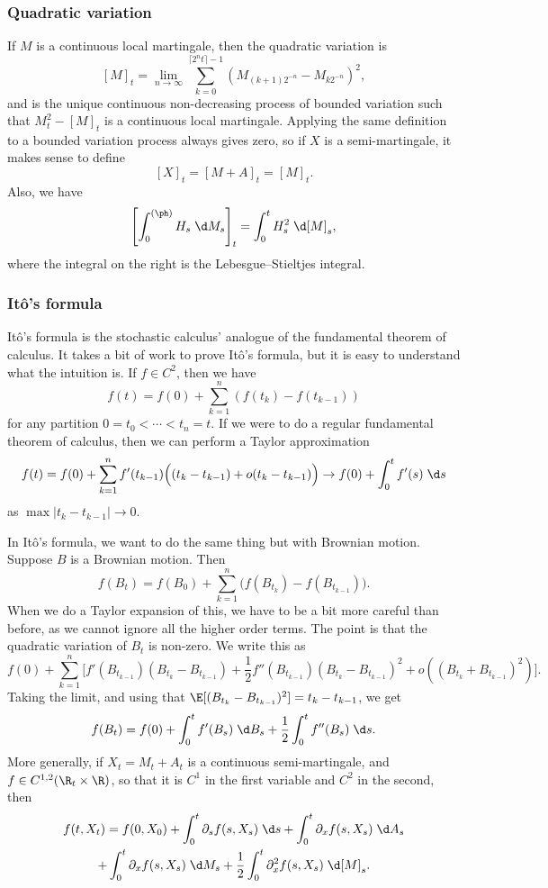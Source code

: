 \documentclass[a4paper]{article}
\begin{document}
\subsubsection*{Quadratic variation}
If $M$ is a continuous local martingale, then the quadratic variation is
\[
  [M]_t = \lim_{n \to \infty} \sum_{k = 0}^{\lceil 2^n t\rceil - 1}(M_{(k + 1)2^{-n}} - M_{k2^{-n}})^2,
\]
and is the unique continuous non-decreasing process of bounded variation such that $M_t^2 - [M]_t$ is a continuous local martingale. Applying the same definition to a bounded variation process always gives zero, so if $X$ is a semi-martingale, it makes sense to define
\[
  [X]_t = [M + A]_t = [M]_t.
\]
Also, we have
\[
  \left[\int_0^{(\ph)} H_s\;\d M_s\right]_t = \int_0^t H_s^2 \;\d [M]_s,
\]
where the integral on the right is the Lebesgue--Stieltjes integral.

\subsubsection*{It\^o's formula}
It\^o's formula is the stochastic calculus' analogue of the fundamental theorem of calculus. It takes a bit of work to prove It\^o's formula, but it is easy to understand what the intuition is. If $f \in C^2$, then we have
\[
  f(t) = f(0) + \sum_{k = 1}^n (f(t_k) - f(t_{k - 1}))
\]
for any partition $0 = t_0 < \cdots < t_n = t$. If we were to do a regular fundamental theorem of calculus, then we can perform a Taylor approximation
\[
  f(t) = f(0) + \sum_{k = 1}^n f'(t_{k - 1})\Big((t_k - t_{k - 1}) + o(t_k - t_{k - 1})\Big) \to f(0) + \int_0^t f'(s)\;\d s
\]
as $\max |t_k - t_{k - 1}| \to 0$.

In It\^o's formula, we want to do the same thing but with Brownian motion. Suppose $B$ is a Brownian motion. Then
\[
  f(B_t) = f(B_0) + \sum_{k = 1}^n \Big(f(B_{t_k}) - f(B_{t_{k - 1}})\Big).
\]
When we do a Taylor expansion of this, we have to be a bit more careful than before, as we cannot ignore all the higher order terms. The point is that the quadratic variation of $B_t$ is non-zero. We write this as
\[
  f(0) + \sum_{k = 1}^n \Big[f'(B_{t_{k\!-\!1}}) (B_{t_k} - B_{t_{k\!-\!1}}) + \frac{1}{2} f''(B_{t_{k\!-\!1}}) (B_{t_k} - B_{t_{k\!-\!1}})^2 + o((B_{t_k} + B_{t_{k\!-\!1}})^2)\Big].
\]
Taking the limit, and using that $\E[(B_{t_k} - B_{t_{k - 1}})^2] = t_k - t_{k - 1}$, we get
\[
  f(B_t) = f(0) + \int_0^t f'(B_s)\;\d B_s + \frac{1}{2} \int_0^t f''(B_s) \;\d s.
\]
More generally, if $X_t = M_t + A_t$ is a continuous semi-martingale, and $f \in C^{1, 2}(\R_t \times \R)$, so that it is $C^1$ in the first variable and $C^2$ in the second, then
\begin{multline*}
  f(t, X_t) = f(0, X_0) + \int_0^t \partial_s f(s, X_s) \;\d s + \int_0^t \partial_x f(s, X_s)\;\d A_s\\
  + \int_0^t \partial_x f(s, X_s) \;\d M_s + \frac{1}{2} \int_0^t \partial_x^2 f(s, X_s) \;\d [M]_s.
\end{multline*}
\end{document}
